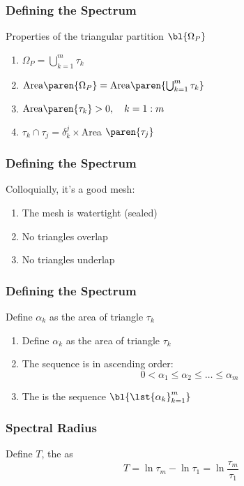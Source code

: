 \begin{frame}
	\frametitle{Defining the Spectrum}
	Properties of the triangular partition $\bl{\Omega_{P}}$\\[10pt]
	\begin{enumerate}
		\item $ \Omega_{P} = \bigcup\limits_{k=1}^{m}\tau_{k} $\\[10pt]
		\item $\text{Area}\paren{\Omega_{P}} = \text{Area}\paren{\bigcup_{k=1}^{m}\tau_{k}}$\\[10pt]
		\item $\text{Area}\paren{\tau_{k}} > 0, \quad k = 1:m$\\[10pt]
		\item $\tau_{k} \cap \tau_{j} = \delta_{k}^{j} \times$Area $\paren{\tau_{j}}$
	\end{enumerate}
\end{frame}

\begin{frame}
	\frametitle{Defining the Spectrum}
	Colloquially, it's a good mesh:\\[10pt]
	\begin{enumerate}
		\item The mesh is watertight (sealed)
		\item No triangles overlap
		\item No triangles underlap
	\end{enumerate}
\end{frame}

\begin{frame}
	\frametitle{Defining the Spectrum}
	Define $\alpha_{k}$ as the area of triangle $\tau_{k}$\\[10pt]
	\begin{enumerate}
		\item Define $\alpha_{k}$ as the area of triangle $\tau_{k}$
		\item The sequence is in ascending order:
		$$0 < \alpha_{1} \le \alpha_{2} \le \dots \le \alpha_{m}$$
 		\item The  is the sequence $\bl{\lst{\alpha_{k}}_{k=1}^{m}}$
	\end{enumerate}
\end{frame}

\begin{frame}
	\frametitle{Spectral Radius}
	Define $T$, the  as\\[10pt]
	$$T=\ln \tau_{m} - \ln \tau_{1} = \ln \frac{\tau_{m}}{\tau_{1}}$$
\end{frame}

